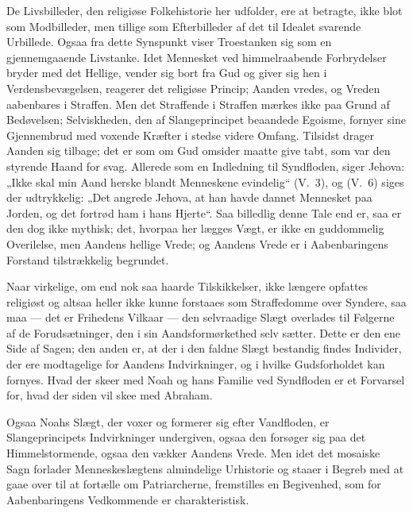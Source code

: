 \documentclass[12pt]{book}
\begin{document}
De Livsbilleder, den religiøse Folkehistorie her udfolder, ere at
betragte, ikke blot som Modbilleder, men tillige som Efterbilleder
af det til Idealet svarende Urbillede. Ogsaa fra dette Synspunkt
viser Troestanken sig som en gjennemgaaende Livstanke. Idet
Mennesket ved himmelraabende Forbrydelser bryder med det Hellige,
vender sig bort fra Gud og giver sig hen i Verdensbevægelsen,
reagerer det religiøse Princip; Aanden vredes, og Vreden aabenbares
i Straffen. Men det Straffende i Straffen mærkes ikke paa Grund af
Bedøvelsen; Selviskheden, den af Slangeprincipet beaandede Egoisme,
fornyer sine Gjennembrud med voxende Kræfter i stedse videre Omfang.
Tilsidst drager Aanden sig tilbage; det er som om Gud omsider maatte
give tabt, som var den styrende Haand for svag. Allerede som en
Indledning til Syndfloden, siger Jehova: „Ikke skal min Aand herske
blandt Menneskene evindelig“ (V.\ 3), og (V.\ 6) siges der
udtrykkelig: „Det angrede Jehova, at han havde dannet Mennesket paa
Jorden, og det fortrød ham i hans Hjerte“. Saa billedlig denne Tale
end er, saa er den dog ikke mythisk; det, hvorpaa her lægges Vægt,
er ikke en guddommelig Overilelse, men Aandens hellige Vrede; og
Aandens Vrede er i Aabenbaringens Forstand tilstrækkelig begrundet.

Naar virkelige, om end nok saa haarde Tilskikkelser, ikke længere
opfattes religiøst og altsaa heller ikke kunne forstaaes som
Straffedomme over Syndere, saa
maa --- det er Frihedens Vilkaar --- den selvraadige Slægt overlades
til Følgerne af de Forudsætninger, den i sin Aandsformørkethed selv
sætter. Dette er den ene Side af Sagen; den anden er, at der i den
faldne Slægt bestandig findes Individer, der ere modtagelige for
Aandens Indvirkninger, og i hvilke Gudsforholdet kan fornyes. Hvad
der skeer med Noah og hans Familie ved Syndfloden er et Forvarsel
for, hvad der siden vil skee med Abraham.

Ogsaa Noahs Slægt, der voxer og formerer sig efter Vandfloden, er
Slangeprincipets Indvirkninger undergiven, ogsaa den forsøger sig
paa det Himmelstormende, ogsaa den vækker Aandens Vrede. Men idet
det mosaiske Sagn forlader Menneskeslægtens almindelige Urhistorie
og staaer i Begreb med at gaae over til at fortælle om
Patriarcherne, fremstilles en Begivenhed, som for Aabenbaringens
Vedkommende er charakteristisk.
\end{document}
